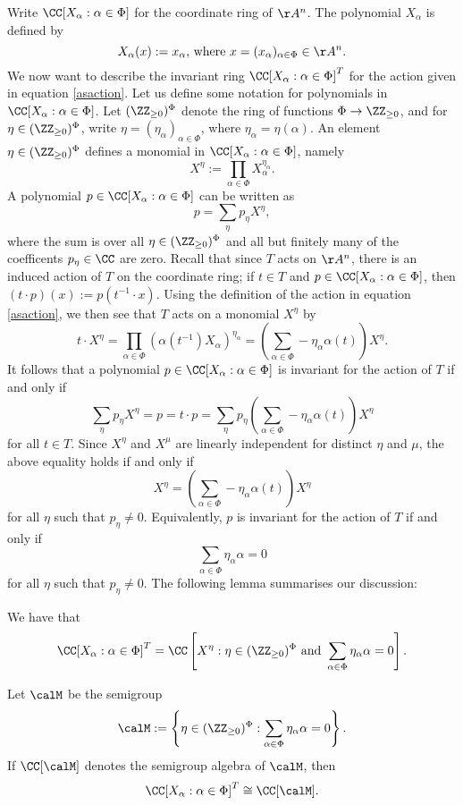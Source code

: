 Write $\CC[X_\alpha : \alpha \in \Phi]$ for the coordinate ring of $\AA^n$.
The polynomial $X_\alpha$ is defined by
$$X_\alpha(x) := x_\alpha, \, \text{where } x = (x_\alpha)_{\alpha \in \Phi} \in \AA^n.$$
We now want to describe the invariant ring $\CC[X_\alpha:\alpha\in\Phi]^T$ for the action given in equation \ref{asaction}.
Let us define some notation for polynomials in $\CC[X_\alpha : \alpha \in \Phi]$.
Let $(\ZZ_{\ge 0})^\Phi$ denote the ring of functions $\Phi \to \ZZ_{\ge 0}$, and for $\eta \in (\ZZ_{\ge 0})^\Phi$, write $\eta = (\eta_\alpha)_{\alpha \in \Phi}$, where $\eta_\alpha = \eta(\alpha)$.
An element $\eta \in (\ZZ_{\ge 0})^\Phi$ defines a monomial in $\CC[X_\alpha : \alpha \in \Phi]$, namely
$$X^\eta := \prod_{\alpha \in \Phi} X_\alpha^{\eta_\alpha}.$$
A polynomial $p \in \CC[X_\alpha : \alpha \in \Phi]$ can be written as
$$p = \sum_{\eta} p_\eta X^\eta,$$
where the sum is over all $\eta \in (\ZZ_{\ge 0})^\Phi$ and all but finitely many of the coefficents $p_\eta \in \CC$ are zero.
Recall that since $T$ acts on $\AA^n$, there is an induced action of $T$ on the coordinate ring;
if $t \in T$ and $p \in \CC[X_\alpha : \alpha \in \Phi]$, then $(t \cdot p)(x) := p(t^{-1} \cdot x)$.
Using the definition of the action in equation \ref{asaction}, we then see that $T$ acts on a monomial $X^\eta$ by
$$t \cdot X^\eta = \prod_{\alpha \in \Phi} (\alpha(t^{-1}) X_\alpha)^{\eta_\alpha} = \left(\sum_{\alpha \in \Phi} - \eta_\alpha \alpha(t)\right) X^\eta.$$
It follows that a polynomial $p \in \CC[X_\alpha : \alpha \in \Phi]$ is invariant for the action of $T$ if and only if 
$$\sum_{\eta} p_\eta X^\eta = p = t \cdot p = \sum_{\eta} p_\eta \left(\sum_{\alpha \in \Phi} - \eta_\alpha \alpha(t)\right) X^\eta$$
for all $t \in T$.
Since $X^\eta$ and $X^\mu$ are linearly independent for distinct $\eta$ and $\mu$, the above equality holds if and only if
$$X^\eta = \left(\sum_{\alpha \in \Phi} - \eta_\alpha \alpha(t)\right) X^\eta$$
for all $\eta$ such that $p_\eta \ne 0$.
Equivalently, $p$ is invariant for the action of $T$ if and only if 
$$\sum_{\alpha \in \Phi} \eta_\alpha \alpha = 0$$
for all $\eta$ such that $p_\eta \ne 0$.
The following lemma summarises our discussion:

\begin{lemma}
We have that
$$\CC[X_\alpha : \alpha \in \Phi]^T = \CC\left[X^\eta : \eta \in (\ZZ_{\ge 0})^\Phi \text{ and } \sum_{\alpha \in \Phi} \eta_\alpha \alpha = 0\right].$$
\end{lemma}
\begin{corollary}
Let $\calM$ be the semigroup
$$\calM := \left\{\eta \in (\ZZ_{\ge 0})^\Phi : \sum_{\alpha \in \Phi} \eta_\alpha \alpha = 0\right\}.$$
If $\CC[\calM]$ denotes the semigroup algebra of $\calM$, then
$$\CC[X_\alpha : \alpha \in \Phi]^T \cong \CC[\calM].$$
\end{corollary}

